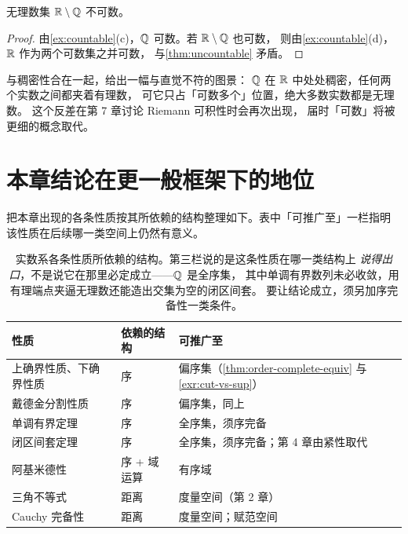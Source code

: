 \begin{corollary}
  \label{cor:irrationals}
  无理数集 \(\mathbb{R} \setminus \mathbb{Q}\) 不可数。
\end{corollary}

\begin{proof}
  由\cref{ex:countable}(c)，\(\mathbb{Q}\) 可数。若 \(\mathbb{R} \setminus \mathbb{Q}\) 也可数，
  则由\cref{ex:countable}(d)，\(\mathbb{R}\) 作为两个可数集之并可数，
  与\cref{thm:uncountable} 矛盾。
\end{proof}

\begin{remark}
   与稠密性合在一起，给出一幅与直觉不符的图景：
  \(\mathbb{Q}\) 在 \(\mathbb{R}\) 中处处稠密，任何两个实数之间都夹着有理数，
  可它只占「可数多个」位置，绝大多数实数都是无理数。
  这个反差在第 7 章讨论 Riemann 可积性时会再次出现，
  届时「可数」将被更细的概念取代。
\end{remark}

\section{本章结论在更一般框架下的地位}
\label{sec:outlook}

把本章出现的各条性质按其所依赖的结构整理如下。表中「可推广至」一栏指明
该性质在后续哪一类空间上仍然有意义。

\begin{table}[htbp]
  \centering
  \caption{实数系各条性质所依赖的结构。第三栏说的是这条性质在哪一类结构上%
    \emph{说得出口}，不是说它在那里必定成立——\(\mathbb{Q}\) 是全序集，
    其中单调有界数列未必收敛，用有理端点夹逼无理数还能造出交集为空的闭区间套。
    要让结论成立，须另加序完备性一类条件。}
  \label{tab:structure-dependence}
  \begin{tabular}{@{}lll@{}}
    \toprule
    性质 & 依赖的结构 & 可推广至 \\
    \midrule
    上确界性质、下确界性质 & 序           & 偏序集（\cref{thm:order-complete-equiv} 与\cref{exr:cut-vs-sup}） \\
    戴德金分割性质         & 序           & 偏序集，同上 \\
    单调有界定理           & 序           & 全序集，须序完备 \\
    闭区间套定理           & 序           & 全序集，须序完备；第 4 章由紧性取代 \\
    阿基米德性             & 序 + 域运算  & 有序域 \\
    三角不等式             & 距离         & 度量空间（第 2 章） \\
    Cauchy 完备性          & 距离         & 度量空间；赋范空间 \\
    \bottomrule
  \end{tabular}
\end{table}

